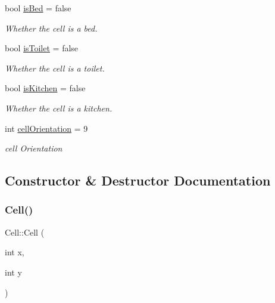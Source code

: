 \begin{DoxyCompactItemize}
\mbox{\label{class_cell_a90887fb2f575d1938926eb2d538a333b}} 
bool \hyperlink{class_cell_a90887fb2f575d1938926eb2d538a333b}{is\+Bed} = false
\begin{DoxyCompactList}\small\item\em Whether the cell is a bed. \end{DoxyCompactList}\item 
\mbox{\label{class_cell_a850b57eb873da4733a5253ecf432fb29}} 
bool \hyperlink{class_cell_a850b57eb873da4733a5253ecf432fb29}{is\+Toilet} = false
\begin{DoxyCompactList}\small\item\em Whether the cell is a toilet. \end{DoxyCompactList}\item 
\mbox{\label{class_cell_a2a7426d84b03f02c565199adf2ac7c30}} 
bool \hyperlink{class_cell_a2a7426d84b03f02c565199adf2ac7c30}{is\+Kitchen} = false
\begin{DoxyCompactList}\small\item\em Whether the cell is a kitchen. \end{DoxyCompactList}\item 
\mbox{\label{class_cell_a4a2b5e80374320e0a58defa625553969}} 
int \hyperlink{class_cell_a4a2b5e80374320e0a58defa625553969}{cell\+Orientation} = 9
\begin{DoxyCompactList}\small\item\em cell Orientation \end{DoxyCompactList}\end{DoxyCompactItemize}


\subsection{Constructor \& Destructor Documentation}
\mbox{\label{class_cell_aa39ad04eeebb7bf00d592ad36640337e}} 
\subsubsection{\texorpdfstring{Cell()}{Cell()}}
{\footnotesize\ttfamily Cell\+::\+Cell (\begin{DoxyParamCaption}\item[{int}]{x,  }\item[{int}]{y }\end{DoxyParamCaption})}



